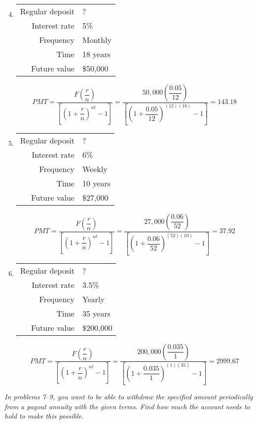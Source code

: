 \begin{enumerate}
\setcounter{enumi}{3}
\item \begin{tabular}{r l}
Regular deposit & ?\\
Interest rate & 5\%\\
Frequency & Monthly\\
Time & 18 years\\
Future value & \$50,000
\end{tabular} 
\[PMT = \dfrac{F\left(\dfrac{r}{n}\right)}{\left[\left(1+\dfrac{r}{n}\right)^{nt}-1\right]} = \dfrac{50,000\left(\dfrac{0.05}{12}\right)}{\left[\left(1+\dfrac{0.05}{12}\right)^{(12)(18)}-1\right]} = 143.18\]

\item \begin{tabular}{r l}
Regular deposit & ?\\
Interest rate & 6\%\\
Frequency & Weekly\\
Time & 10 years\\
Future value & \$27,000
\end{tabular} 
\[PMT = \dfrac{F\left(\dfrac{r}{n}\right)}{\left[\left(1+\dfrac{r}{n}\right)^{nt}-1\right]} = \dfrac{27,000\left(\dfrac{0.06}{52}\right)}{\left[\left(1+\dfrac{0.06}{52}\right)^{(52)(10)}-1\right]} = 37.92\]

\item \begin{tabular}{r l}
Regular deposit & ?\\
Interest rate & 3.5\%\\
Frequency & Yearly\\
Time & 35 years\\
Future value & \$200,000
\end{tabular} 
\[PMT = \dfrac{F\left(\dfrac{r}{n}\right)}{\left[\left(1+\dfrac{r}{n}\right)^{nt}-1\right]} = \dfrac{200,000\left(\dfrac{0.035}{1}\right)}{\left[\left(1+\dfrac{0.035}{1}\right)^{(1)(35)}-1\right]} = 2999.67\]
\end{enumerate}

\emph{In problems 7--9, you want to be able to withdraw the specified amount periodically from a payout annuity with the given terms.  Find how much the account needs to hold to make this possible.}

